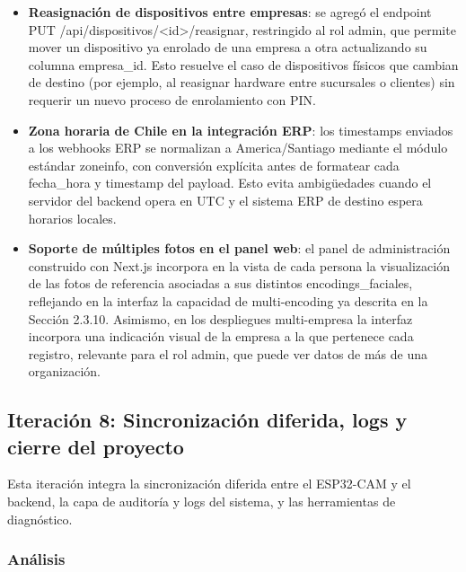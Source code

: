 \begin{itemize}
    \item \textbf{Reasignación de dispositivos entre empresas}: se agregó el endpoint PUT /api/dispositivos/<id>/reasignar, restringido al rol admin, que permite mover un dispositivo ya enrolado de una empresa a otra actualizando su columna empresa\_id. Esto resuelve el caso de dispositivos físicos que cambian de destino (por ejemplo, al reasignar hardware entre sucursales o clientes) sin requerir un nuevo proceso de enrolamiento con PIN.

    \item \textbf{Zona horaria de Chile en la integración ERP}: los timestamps enviados a los webhooks ERP se normalizan a America/Santiago mediante el módulo estándar zoneinfo, con conversión explícita antes de formatear cada fecha\_hora y timestamp del payload. Esto evita ambigüedades cuando el servidor del backend opera en UTC y el sistema ERP de destino espera horarios locales.

    \item \textbf{Soporte de múltiples fotos en el panel web}: el panel de administración construido con Next.js incorpora en la vista de cada persona la visualización de las fotos de referencia asociadas a sus distintos encodings\_faciales, reflejando en la interfaz la capacidad de multi-encoding ya descrita en la Sección 2.3.10. Asimismo, en los despliegues multi-empresa la interfaz incorpora una indicación visual de la empresa a la que pertenece cada registro, relevante para el rol admin, que puede ver datos de más de una organización.
\end{itemize}



\subsection{Iteración 8: Sincronización diferida, logs y cierre del proyecto}

Esta iteración integra la sincronización diferida entre el ESP32-CAM y el backend, la capa de auditoría y logs del sistema, y las herramientas de diagnóstico.

\subsubsection{Análisis}

